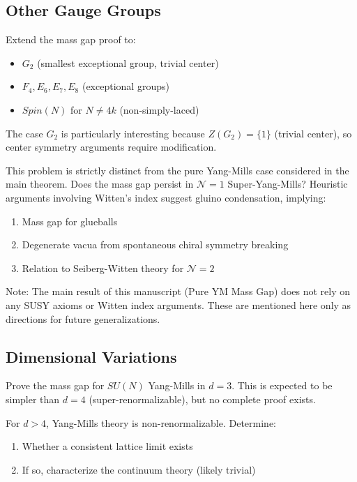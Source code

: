 \subsection{Other Gauge Groups}

\begin{problem}
Extend the mass gap proof to:
\begin{itemize}
\item $G_2$ (smallest exceptional group, trivial center)
\item $F_4, E_6, E_7, E_8$ (exceptional groups)
\item $Spin(N)$ for $N \neq 4k$ (non-simply-laced)
\end{itemize}
\end{problem}

The case $G_2$ is particularly interesting because $Z(G_2) = \{1\}$ (trivial 
center), so center symmetry arguments require modification.

\begin{problem}
This problem is strictly distinct from the pure Yang-Mills case considered in the main theorem.
Does the mass gap persist in $\mathcal{N} = 1$ Super-Yang-Mills? 
Heuristic arguments involving Witten's index suggest gluino condensation, implying:
\begin{enumerate}[label=(\roman*)]
\item Mass gap for glueballs
\item Degenerate vacua from spontaneous chiral symmetry breaking
\item Relation to Seiberg-Witten theory for $\mathcal{N} = 2$
\end{enumerate}
Note: The main result of this manuscript (Pure YM Mass Gap) does not rely on any SUSY axioms or Witten index arguments. These are mentioned here only as directions for future generalizations.
\end{problem}

\subsection{Dimensional Variations}

\begin{problem}
Prove the mass gap for $SU(N)$ Yang-Mills in $d = 3$. This is expected to 
be simpler than $d = 4$ (super-renormalizable), but no complete proof exists.
\end{problem}

\begin{problem}
For $d > 4$, Yang-Mills theory is non-renormalizable. Determine:
\begin{enumerate}[label=(\alph*)]
\item Whether a consistent lattice limit exists
\item If so, characterize the continuum theory (likely trivial)
\end{enumerate}
\end{problem}

